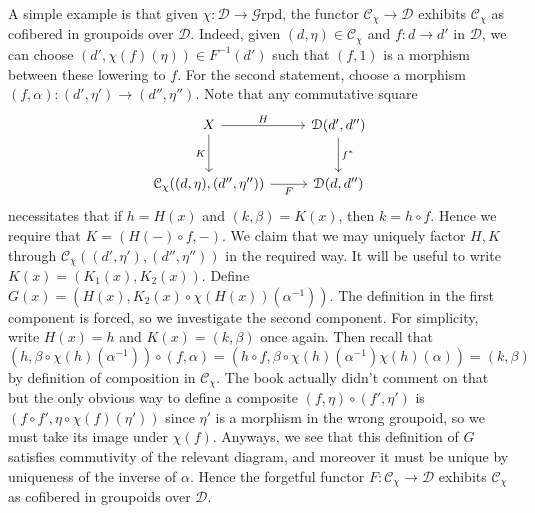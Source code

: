 A simple example is that given $\chi : \mathcal{D}  \to \mathcal{G} \mathrm{rpd} $, the functor $\mathcal{C} _\chi \to \mathcal{D} $ exhibits $\mathcal{C} _\chi $ as cofibered in groupoids over $\mathcal{D} $. Indeed, given $(d,\eta )\in \mathcal{C} _\chi$ and $f : d \to d'$ in $\mathcal{D} $, we can choose $(d',\chi (f)(\eta ))\in F^{-1} (d')$ such that $(f,1)$ is a morphism between these lowering to $f$. For the second statement, choose a morphism $(f,\alpha ): (d',\eta ') \to (d'',\eta '')$. Note that any commutative square
\[\begin{tikzcd}[row sep = 2.5em, column sep = 2.5em]
X \ar[" H ", r] \ar[" K "', d]  & \mathcal{D} (d',d'')\ar[" f^* ", d]  \\
\mathcal{C} _{\chi } ((d,\eta ),(d'',\eta ''))\ar[" F "', r]  & \mathcal{D} (d,d'')
\end{tikzcd}\]
necessitates that if $h=H(x)$ and $(k,\beta )=K(x)$, then $k=h\circ f$. Hence we require that $K=(H(-)\circ f, -)$. We claim that we may uniquely factor $H,K$ through $\mathcal{C} _\chi ((d',\eta '),(d'',\eta ''))$ in the required way. It will be useful to write $K(x)=(K_1(x),K_2(x))$. Define $G(x)=(H(x),K_2(x)\circ \chi (H(x))(\alpha ^{-1} ))$. The definition in the first component is forced, so we investigate the second component. For simplicity, write $H(x)=h$ and $K(x)=(k,\beta )$ once again. Then recall that
\[
	(h,\beta\circ \chi (h)(\alpha^{-1}  ) )\circ (f,\alpha )=(h\circ f,\beta \circ \chi (h)(\alpha ^{-1} ) \chi (h)(\alpha ))=(k,\beta )
\]
by definition of composition in $\mathcal{C} _\chi $. The book actually didn't comment on that but the only obvious way to define a composite $(f,\eta )\circ (f',\eta ')$ is $(f\circ f',\eta \circ \chi (f)(\eta '))$ since $\eta '$ is a morphism in the wrong groupoid, so we must take its image under $\chi (f)$. Anyways, we see that this definition of $G$ satisfies commutivity of the relevant diagram, and moreover it must be unique by uniqueness of the inverse of $\alpha $. Hence the forgetful functor $F : \mathcal{C} _\chi  \to \mathcal{D} $ exhibits $\mathcal{C} _\chi $ as cofibered in groupoids over $\mathcal{D} $.

